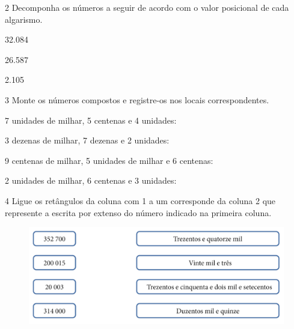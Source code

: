 \num{2} Decomponha os números a seguir de acordo com o valor posicional de
cada algarismo.

\begin{escolha}
\item 32.084

\item {}

\item 26.587

\item {}

\item 2.105
\item{}
\end{escolha}


\num{3} Monte os números compostos e registre-os nos locais correspondentes.

\begin{escolha}
\item 7 unidades de milhar, 5 centenas e 4 unidades: 

\item 3 dezenas de milhar, 7 dezenas e 2 unidades: 

\item 9 centenas de milhar, 5 unidades de milhar e 6 centenas: 

\item 2 unidades de milhar, 6 centenas e 3 unidades: 
\end{escolha}


\pagebreak
\num{4} Ligue os retângulos da coluna com 1 a um corresponde da coluna 2
que represente a escrita por extenso do número indicado na primeira
coluna.

\begin{figure}[htpb!]
\includegraphics[width=\textwidth]{../ilustracoes/MAT5/SAEB_5ANO_MAT_figura3.png}
\end{figure}

